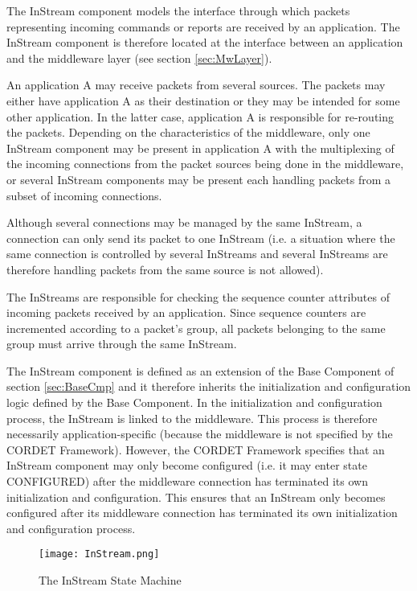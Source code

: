 The InStream component models the interface through which packets representing incoming commands or reports are received by an application. The InStream component is therefore located at the interface between an application and the middleware layer (see section \ref{sec:MwLayer}). 

An application A may receive packets from several sources. The packets may either have application A as their destination or they may be intended for some other application. In the latter case, application A is responsible for re-routing the packets. Depending on the characteristics of the middleware, only one InStream component may be present in application A with the multiplexing of the incoming connections from the packet sources being done in the middleware, or several InStream components may be present each handling packets from a subset of incoming connections. 

Although several connections may be managed by the same InStream, a connection can only send its packet to one InStream (i.e. a situation where the same connection is controlled by several InStreams and several InStreams are therefore handling packets from the same source is not allowed).

The InStreams are responsible for checking the sequence counter attributes of incoming packets received by an application. Since sequence counters are incremented according to a packet's group, all packets belonging to the same group must arrive through the same InStream.

The InStream component is defined as an extension of the Base Component of section \ref{sec:BaseCmp} and it therefore inherits the initialization and configuration logic defined by the Base Component. In the initialization and configuration process, the InStream is linked to the middleware. This process is therefore necessarily application-specific (because the middleware is not specified by the CORDET Framework). However, the CORDET Framework specifies that an InStream component may only become configured (i.e. it may enter state CONFIGURED) after the middleware connection has terminated its own initialization and configuration. This ensures that an InStream only becomes configured after its middleware connection has terminated its own initialization and configuration process.

\begin{figure}[ht]
 \centering
 \texttt{[image: InStream.png]}
 \caption{The InStream State Machine}
 \label{fig:InStream}
\end{figure}

